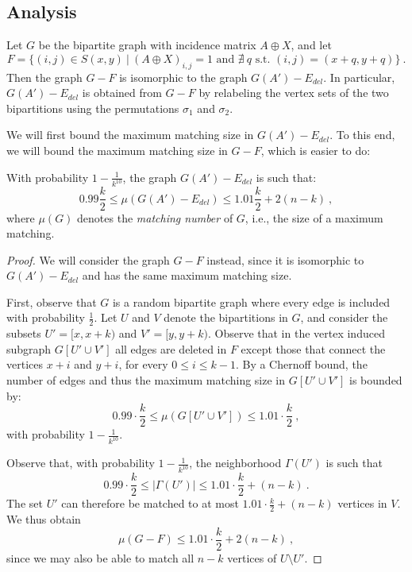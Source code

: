 \subsection{Analysis}
Let $G$ be the bipartite graph with incidence matrix $A \oplus X$, and let 
$$F = \{ (i,j) \in S(x,y) \ | \ (A \oplus X)_{i,j} = 1 \mbox{ and } \nexists \ q \mbox{ s.t. } (i,j) = (x+q, y+q) \} \ .$$
Then the graph $G - F$ is isomorphic to the graph $G(A') - E_{del}$. In particular, 
$G(A') - E_{del}$ is obtained from $G - F$ by relabeling the vertex sets of the two bipartitions
using the permutations $\sigma_1$ and $\sigma_2$. 

We will first bound the maximum matching size in $G(A') - E_{del}$. To this end, we will bound the 
maximum matching size in $G - F$, which is easier to do:

\begin{lemma}\label{lem:matching-size}
 With probability $1-\frac{1}{k^{10}}$, the graph $G(A') - E_{del}$ is such that:
 $$0.99 \frac{k}{2} \le \mu(G(A') - E_{del}) \le 1.01 \frac{k}{2} + 2(n-k) \ ,$$
 where $\mu(G)$ denotes the \emph{matching number} of $G$, i.e., the size of a maximum matching.
\end{lemma}
\begin{proof}
 We will consider the graph $G - F$ instead, since it is isomorphic to $G(A') - E_{del}$ and has the same
 maximum matching size.
 
 First, observe that $G$ is a random bipartite graph where every edge is included with probability $\frac{1}{2}$.
 Let $U$ and $V$ denote the bipartitions in $G$, and consider the subsets $U' = [x, x+k)$ and $V' = [y, y+k)$.
 Observe that in the vertex induced subgraph $G[U' \cup V']$
 all edges are deleted in $F$ except those that connect 
 the vertices $x+i$ and $y+i$, for every $0 \le i \le k-1$. By a Chernoff bound, the number of edges and thus
 the maximum matching size in $G[U' \cup V']$ is bounded by:
 $$0.99 \cdot \frac{k}{2} \le \mu(G[U' \cup V']) \le 1.01 \cdot \frac{k}{2} \ , $$
 with probability $1 - \frac{1}{k^{10}}$.
 
 Observe that, with probability $1 - \frac{1}{k^{10}}$, the neighborhood $\Gamma(U')$ is such that 
 $$0.99 \cdot \frac{k}{2} \le |\Gamma(U')| \le 1.01 \cdot \frac{k}{2} + (n-k) \ .$$ 
 The set $U'$ can therefore be matched to at most $1.01 \cdot \frac{k}{2} + (n-k)$ vertices in $V$. 
 We thus obtain
 $$\mu(G - F) \le 1.01 \cdot \frac{k}{2} + 2(n-k) \ ,$$
 since we may also be able to match all $n-k$ vertices of $U \setminus U'$. 
\end{proof}


